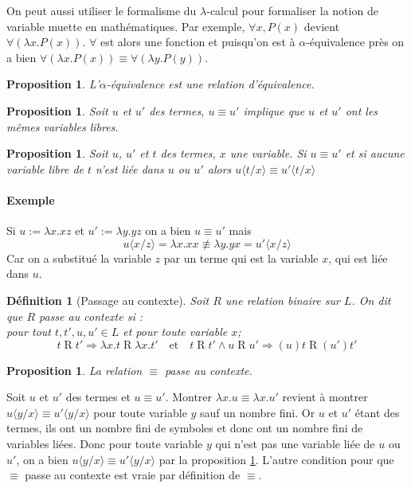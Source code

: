 \documentclass[a4paper,12pt]{article}
\theoremstyle{plain}
\newtheorem{prop}[theo]{Proposition}
\newtheorem{defi}[theo]{Définition}
\newenvironment{demo}[1][]
 {\if\relax\detokenize{#1}\relax
    \renewcommand\theproofinner{\thetheo}%
  \else
    \renewcommand{\theproofinner}{#1}%
  \fi
  \proofinner}
 {\endproofinner}
\begin{document}
On peut aussi utiliser le formalisme du $\lambda$-calcul pour formaliser la notion de variable muette en mathématiques. Par exemple, $\forall x, P(x)$ devient $\forall ( \lambda x. P(x))$. $\forall$ est alors une fonction et puisqu'on est à $\alpha$-équivalence près on a bien $\forall ( \lambda x. P(x)) \equiv \forall ( \lambda y. P(y))$.

\begin{prop}
L'$\alpha$-équivalence est une relation d'équivalence.
\end{prop}

\begin{prop}
Soit $u$ et $u'$ des termes, $u \equiv u'$ implique que $u$ et $u'$ ont les mêmes variables libres.
\end{prop}

\begin{prop}
\label{p1}
Soit $u$, $u'$ et $t$ des termes, $x$ une variable. Si $u \equiv u'$ et si aucune variable libre de $t$ n'est liée dans $u$ ou $u'$ alors $u \langle t/x \rangle \equiv u' \langle t/x \rangle$
\end{prop}

\paragraph{Exemple}
Si $u := \lambda x. xz$ et $u' := \lambda y.yz$ on a bien
$u \equiv u'$ mais
$$u \langle x/z \rangle = \lambda x.xx \not \equiv \lambda y.yx = u' \langle x/z \rangle$$
Car on a substitué la variable $z$ par un terme qui est la variable
$x$, qui est liée dans $u$.

\begin{defi}[Passage au contexte]
Soit $R$ une relation binaire sur $L$. On dit que $R$ passe au contexte si : \\
pour tout  $t, t', u, u' \in L$ et pour toute variable $x$;
$$ t \mathbin{R} t' \Rightarrow\lambda x.t \mathbin{R} \lambda x.t' \quad \text{et} \quad t \mathbin{R} t' \land u \mathbin{R} u' \Rightarrow(u)t  \mathbin{R} (u')t' $$
\end{defi}

\begin{prop}
La relation $\equiv$ passe au contexte.
\end{prop}

\begin{demo} Soit $u$ et $u'$ des termes et $u \equiv u'$. Montrer $\lambda x.u \equiv \lambda x.u'$ revient à montrer $u \langle y/x \rangle \equiv u' \langle y/x \rangle$ pour toute variable $y$ sauf un nombre fini. Or $u$ et $u'$ étant des termes, ils ont un nombre fini de symboles et donc ont un nombre fini de variables liées. Donc pour toute variable $y$ qui n'est pas une variable liée de $u$ ou $u'$, on a bien $u \langle y/x \rangle \equiv u' \langle y/x \rangle$ par la proposition \ref{p1}. L'autre condition pour que $\equiv$ passe au contexte est vraie par définition de $\equiv$.
\end{demo}
\end{document}
